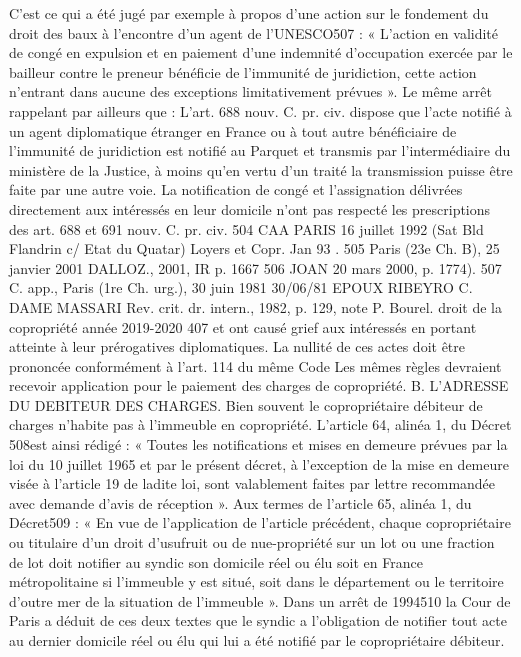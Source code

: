 C’est ce qui a été jugé par exemple à propos d’une action sur le fondement du droit des baux à l’encontre d’un agent de l’UNESCO507 :
« L’action en validité de congé en expulsion et en paiement d'une indemnité d'occupation exercée par le bailleur contre le preneur bénéficie de l'immunité de juridiction, cette action n'entrant dans aucune des exceptions limitativement prévues ».
Le même arrêt rappelant par ailleurs que :
L’art. 688 nouv. C. pr. civ. dispose que l'acte notifié à un agent diplomatique étranger en France ou à tout autre bénéficiaire de l'immunité de juridiction est notifié au Parquet et transmis par l'intermédiaire du ministère de la Justice, à moins qu'en vertu d'un traité la transmission puisse être faite par une autre voie. La notification de congé et l'assignation délivrées directement aux intéressés en leur domicile n'ont pas respecté les prescriptions des art. 688 et 691 nouv. C. pr. civ.
504 CAA PARIS 16 juillet 1992 (Sat Bld Flandrin c/ Etat du Quatar) Loyers et Copr. Jan 93 .
505 Paris (23e Ch. B), 25 janvier 2001 DALLOZ., 2001, IR p. 1667
506 JOAN 20 mars 2000, p. 1774).
507 C. app., Paris (1re Ch. urg.), 30 juin 1981 30/06/81 EPOUX RIBEYRO C. DAME MASSARI
Rev. crit. dr. intern., 1982, p. 129, note P. Bourel.
droit de la copropriété année 2019-2020
407
et ont causé grief aux intéressés en portant atteinte à leur prérogatives diplomatiques. La nullité de ces actes doit être prononcée conformément à l'art. 114 du même Code
Les mêmes règles devraient recevoir application pour le paiement des charges de copropriété.
B. L’ADRESSE DU DEBITEUR DES CHARGES.
Bien souvent le copropriétaire débiteur de charges n’habite pas à l’immeuble en copropriété.
L’article 64, alinéa 1, du Décret 508est ainsi rédigé :
« Toutes les notifications et mises en demeure prévues par la loi du 10 juillet 1965 et par le présent décret, à l’exception de la mise en demeure visée à l’article 19 de ladite loi, sont valablement faites par lettre recommandée avec demande d’avis de réception ».
Aux termes de l’article 65, alinéa 1, du Décret509 :
« En vue de l’application de l’article précédent, chaque copropriétaire ou titulaire d’un droit d’usufruit ou de nue-propriété sur un lot ou une fraction de lot doit notifier au syndic son domicile réel ou élu soit en France métropolitaine si l’immeuble y est situé, soit dans le département ou le territoire d’outre mer de la situation de l’immeuble ».
Dans un arrêt de 1994510 la Cour de Paris a déduit de ces deux textes que le syndic a l’obligation de notifier tout acte au dernier domicile réel ou élu qui lui a été notifié par le copropriétaire débiteur.
